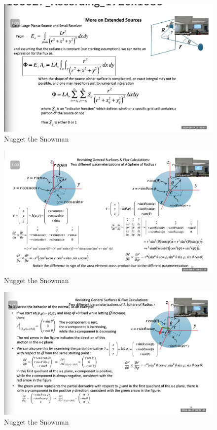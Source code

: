 \documentclass{article}
\begin{document}
\begin{figure}[h!]
\centering
\includegraphics[scale=.6]{Radiometry/Week4/Notes/Sept17/Plane2.png}
\caption{Nugget the Snowman}
\label{fig:Plane2}
\end{figure}

\begin{figure}[h!]
\centering
\includegraphics[scale=.6]{Radiometry/Week4/Notes/Sept17/Spherical.png}
\caption{Nugget the Snowman}
\label{fig:Spherical}
\end{figure}


\begin{figure}[h!]
\centering
\includegraphics[scale=.6]{Radiometry/Week4/Notes/Sept17/Spherical2.png}
\caption{Nugget the Snowman}
\label{fig:Spherical2}
\end{figure}
\end{document}
